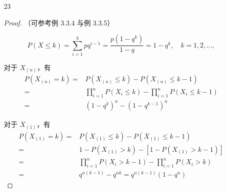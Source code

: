 \documentclass[normal,cn]{elegantnote}
\begin{document}
\begin{enumerate}
\begin{proof}
            因此，样本 $B$ 的中位数 ${m_{0.5}}_{B}$ 为
            \begin{equation*}
                {m_{0.5}}_{B}=a{m_{0.5}}_{A}+b.
            \end{equation*}
        \end{proof}

    \item[23]
        \begin{proof}
            （可参考例 3.3.4 与例 3.3.5）

            \begin{equation*}
                P\left(X\leq k\right)=\sum_{i=1}^{k}pq^{i-1}=\frac{p\left(1-q^{k}\right)}{1-q}=1-q^{k},\quad k=1,2,\ldots,
            \end{equation*}

            对于 $X_{(n)}$，有
            \begin{equation*}
                \begin{aligned}
                    P\left(X_{(n)}=k\right)= & P\left(X_{(n)}\leq k\right)-P\left(X_{(n)}\leq k-1\right)                           \\
                    =                        & \prod_{i=1}^{n}P\left(X_{i}\leq k\right)-\prod_{i=1}^{n}P\left(X_{i}\leq k-1\right) \\
                    =                        & \left(1-q^{k}\right)^{n}-\left(1-q^{k-1}\right)^{n}
                \end{aligned}
            \end{equation*}

            对于 $X_{(1)}$，有
            \begin{equation*}
                \begin{aligned}
                    P\left(X_{(1)}=k\right)= & P\left(X_{(1)}\leq k\right)-P\left(X_{(1)}\leq k-1\right)                   \\
                    =                        & 1-P\left(X_{(1)}>k\right)-\left[1-P\left(X_{(1)}>k-1\right)\right]          \\
                    =                        & \prod_{i=1}^{n}P\left(X_{i}>k-1\right)-\prod_{i=1}^{n}P\left(X_{i}>k\right) \\
                    =                        & q^{n(k-1)}-q^{n k}=q^{n(k-1)}\left(1-q^n\right)
                \end{aligned}
            \end{equation*}
        \end{proof}


\end{enumerate}
\end{document}
